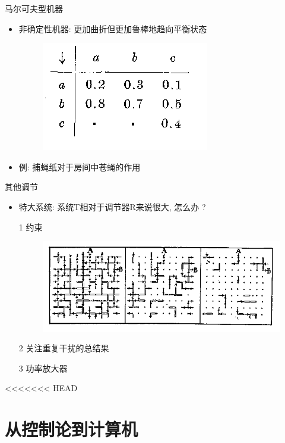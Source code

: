 \documentclass[12pt,AutoFakeBold,aspectratio=43,mathserif]{beamer}
\begin{document}
    \begin{frame}{马尔可夫型机器}
        \begin{itemize}
                \item 非确定性机器: 更加曲折但更加鲁棒地趋向平衡状态
                \begin{figure}[H]
                \centering
                \includegraphics[width=.6\textwidth]{figures/pic3.png}
                \end{figure}
                \item 例: 捕蝇纸对于房间中苍蝇的作用
        \end{itemize}
        
    \end{frame}
      
    \begin{frame}{其他调节}
        \begin{itemize}
                \item 特大系统: 系统T相对于调节器R来说很大, 怎么办 ?
                \item[1] 约束
                \begin{figure}[H]
                \centering
                \includegraphics[width=.6\textwidth]{figures/pic4.png}
                \end{figure}
                \item[2] 关注重复干扰的总结果
                \item[3] 功率放大器
        \end{itemize}
    \end{frame}
<<<<<<< HEAD

    \section{从控制论到计算机}
\end{document}
